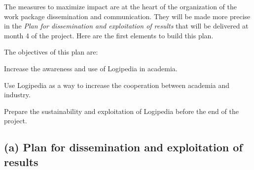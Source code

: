 The measures to maximize impact are at the heart of the organization
of the work package dissemination and communication. They will be made
more precise in the {\em Plan for dissemination and exploitation of
results} that will be delivered at month 4 of the project.
Here are the first elements to build this plan.

The objectives of this plan are:
\begin{compactitem}
\item Increase the awareness and use of Logipedia in academia.
\item Use Logipedia as a way to increase the cooperation between academia and
industry. 
\item Prepare the sustainability and exploitation of Logipedia before the
  end of the project.
\end{compactitem}


\subsection*{(a) Plan for dissemination and exploitation of results}
\label{sec:dissemination}


